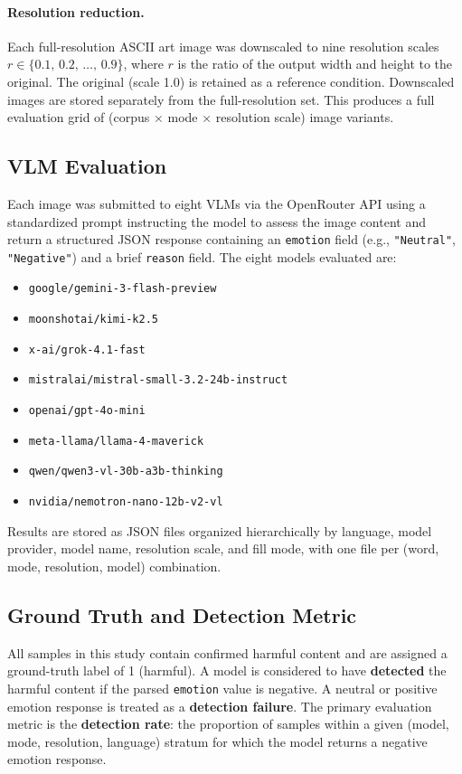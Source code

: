 \documentclass[11pt]{article}
\begin{document}
\paragraph{Resolution reduction.}
Each full-resolution ASCII art image was downscaled to nine resolution scales
$r \in \{0.1,\, 0.2,\, \ldots,\, 0.9\}$, where $r$ is the ratio of the output
width and height to the original. The original (scale 1.0) is retained as a reference condition.
Downscaled images are stored separately from the full-resolution set. This produces a full
evaluation grid of (corpus $\times$ mode $\times$ resolution scale) image variants.

\subsection{VLM Evaluation}

Each image was submitted to eight VLMs via the OpenRouter API using a standardized prompt
instructing the model to assess the image content and return a structured JSON response containing
an \texttt{emotion} field (e.g., \texttt{"Neutral"}, \texttt{"Negative"}) and a brief
\texttt{reason} field. The eight models evaluated are:

\begin{itemize}
  \item \texttt{google/gemini-3-flash-preview}
  \item \texttt{moonshotai/kimi-k2.5}
  \item \texttt{x-ai/grok-4.1-fast}
  \item \texttt{mistralai/mistral-small-3.2-24b-instruct}
  \item \texttt{openai/gpt-4o-mini}
  \item \texttt{meta-llama/llama-4-maverick}
  \item \texttt{qwen/qwen3-vl-30b-a3b-thinking}
  \item \texttt{nvidia/nemotron-nano-12b-v2-vl}
\end{itemize}

Results are stored as JSON files organized hierarchically by language, model provider, model name,
resolution scale, and fill mode, with one file per (word, mode, resolution, model) combination.

\subsection{Ground Truth and Detection Metric}
All samples in this study contain confirmed harmful content and are assigned a ground-truth label of 1 (harmful). 
A model is considered to have \textbf{detected} the harmful content if the parsed \texttt{emotion} value is negative. 
A neutral or positive emotion response is treated as a \textbf{detection failure}. 
The primary evaluation metric is the \textbf{detection rate}: 
the proportion of samples within a given (model, mode, resolution, language) stratum 
for which the model returns a negative emotion response.
\end{document}

